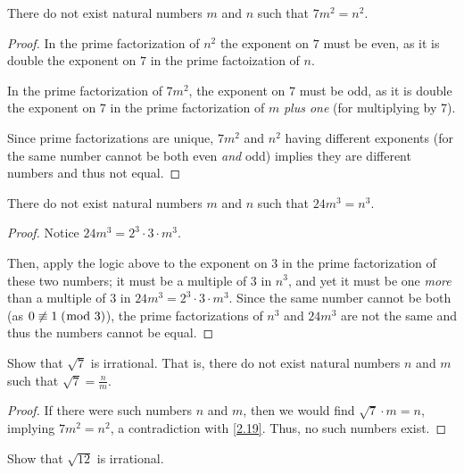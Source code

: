 \documentclass[../main.tex]{subfiles}
\begin{document}
\begin{thm} \label{2.19}
  There do not exist natural numbers $m$ and $n$ such that $7m^2 = n^2$.
\end{thm}

\begin{proof}
  In the prime factorization of $n^2$ the exponent on $7$ must be even, as it is double the exponent on $7$ in the prime factoization of $n$.

  In the prime factorization of $7m^2$, the exponent on $7$ must be odd, as it is double the exponent on $7$ in the prime factorization of $m$ \emph{plus one} (for multiplying by 7).

  Since prime factorizations are unique, $7m^2$ and $n^2$ having different exponents (for the same number cannot be both even \emph{and} odd) implies they are different numbers and thus not equal.
\end{proof}



\begin{thm} \label{2.20}
  There do not exist natural numbers $m$ and $n$ such that $24m^3 = n^3$.
\end{thm}

\begin{proof}
  Notice $24m^3 = 2^3 \cdot 3 \cdot m^3$.

  Then, apply the logic above to the exponent on $3$ in the prime factorization of these two numbers; it must be a multiple of $3$ in $n^3$, and yet it must be one \emph{more} than a multiple of $3$ in $24m^3 = 2^3 \cdot 3 \cdot m^3$. Since the same number cannot be both (as $0 \not \equiv 1 \; (\bmod \; 3)$), the prime factorizations of $n^3$ and $24m^3$ are not the same and thus the numbers cannot be equal.
\end{proof}



\begin{ex} \label{2.21}
  Show that $\sqrt{7}$ is irrational. That is, there do not exist natural numbers $n$ and $m$ such that $\sqrt{7} = \frac{n}{m}$.
\end{ex}

\begin{proof}
  If there were such numbers $n$ and $m$, then we would find $\sqrt{7} \cdot m = n$, implying $7m^2 = n^2$, a contradiction with \ref{2.19}. Thus, no such numbers exist.
\end{proof}



\begin{ex} \label{2.22}
  Show that $\sqrt{12}$ is irrational.
\end{ex}
\end{document}
